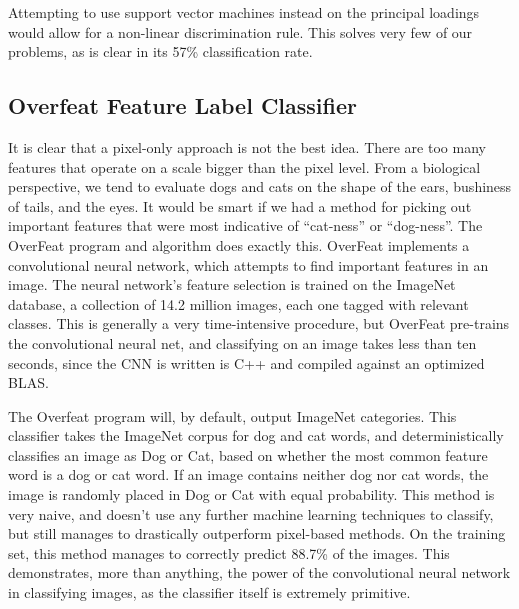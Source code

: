 \documentclass[12pt]{article}
\begin{document}
Attempting to use support vector machines instead on the principal loadings would allow for a non-linear discrimination rule. This solves very few of our problems, as is clear in its 57\% classification rate.

\subsection{Overfeat Feature Label Classifier}
It is clear that a pixel-only approach is not the best idea. There are too many features that operate on a scale bigger than the pixel level. From a biological perspective, we tend to evaluate dogs and cats on the shape of the ears, bushiness of tails, and the eyes. It would be smart if we had a method for picking out important features that were most indicative of ``cat-ness'' or ``dog-ness''. The OverFeat program and algorithm does exactly this. OverFeat implements a convolutional neural network, which attempts to find important features in an image. The neural network's feature selection is trained on the ImageNet database, a collection of 14.2 million images, each one tagged with relevant classes. This is generally a very time-intensive procedure, but OverFeat pre-trains the convolutional neural net, and classifying on an image takes less than ten seconds, since the CNN is written is C++ and compiled against an optimized BLAS.

The Overfeat program will, by default, output ImageNet categories. This classifier takes the ImageNet corpus for dog and cat words, and deterministically classifies an image as Dog or Cat, based on whether the most common feature word is a dog or cat word. If an image contains neither dog nor cat words, the image is randomly placed in Dog or Cat with equal probability. This method is very naive, and doesn't use any further machine learning techniques to classify, but still manages to drastically outperform pixel-based methods. On the training set, this method manages to correctly predict 88.7\% of the images. This demonstrates, more than anything, the power of the convolutional neural network in classifying images, as the classifier itself is extremely primitive.
\end{document}
